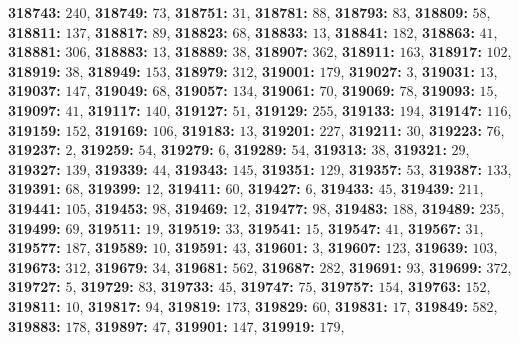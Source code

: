 \textsf{\bfseries 318743:} $240$, \textsf{\bfseries 318749:} $73$, \textsf{\bfseries 318751:} $31$, \textsf{\bfseries 318781:} $88$, \textsf{\bfseries 318793:} $83$, \textsf{\bfseries 318809:} $58$, \textsf{\bfseries 318811:} $137$, \textsf{\bfseries 318817:} $89$, \textsf{\bfseries 318823:} $68$, \textsf{\bfseries 318833:} $13$, \textsf{\bfseries 318841:} $182$, \textsf{\bfseries 318863:} $41$, \textsf{\bfseries 318881:} $306$, \textsf{\bfseries 318883:} $13$, \textsf{\bfseries 318889:} $38$, \textsf{\bfseries 318907:} $362$, \textsf{\bfseries 318911:} $163$, \textsf{\bfseries 318917:} $102$, \textsf{\bfseries 318919:} $38$, \textsf{\bfseries 318949:} $153$, \textsf{\bfseries 318979:} $312$, \textsf{\bfseries 319001:} $179$, \textsf{\bfseries 319027:} $3$, \textsf{\bfseries 319031:} $13$, \textsf{\bfseries 319037:} $147$, \textsf{\bfseries 319049:} $68$, \textsf{\bfseries 319057:} $134$, \textsf{\bfseries 319061:} $70$, \textsf{\bfseries 319069:} $78$, \textsf{\bfseries 319093:} $15$, \textsf{\bfseries 319097:} $41$, \textsf{\bfseries 319117:} $140$, \textsf{\bfseries 319127:} $51$, \textsf{\bfseries 319129:} $255$, \textsf{\bfseries 319133:} $194$, \textsf{\bfseries 319147:} $116$, \textsf{\bfseries 319159:} $152$, \textsf{\bfseries 319169:} $106$, \textsf{\bfseries 319183:} $13$, \textsf{\bfseries 319201:} $227$, \textsf{\bfseries 319211:} $30$, \textsf{\bfseries 319223:} $76$, \textsf{\bfseries 319237:} $2$, \textsf{\bfseries 319259:} $54$, \textsf{\bfseries 319279:} $6$, \textsf{\bfseries 319289:} $54$, \textsf{\bfseries 319313:} $38$, \textsf{\bfseries 319321:} $29$, \textsf{\bfseries 319327:} $139$, \textsf{\bfseries 319339:} $44$, \textsf{\bfseries 319343:} $145$, \textsf{\bfseries 319351:} $129$, \textsf{\bfseries 319357:} $53$, \textsf{\bfseries 319387:} $133$, \textsf{\bfseries 319391:} $68$, \textsf{\bfseries 319399:} $12$, \textsf{\bfseries 319411:} $60$, \textsf{\bfseries 319427:} $6$, \textsf{\bfseries 319433:} $45$, \textsf{\bfseries 319439:} $211$, \textsf{\bfseries 319441:} $105$, \textsf{\bfseries 319453:} $98$, \textsf{\bfseries 319469:} $12$, \textsf{\bfseries 319477:} $98$, \textsf{\bfseries 319483:} $188$, \textsf{\bfseries 319489:} $235$, \textsf{\bfseries 319499:} $69$, \textsf{\bfseries 319511:} $19$, \textsf{\bfseries 319519:} $33$, \textsf{\bfseries 319541:} $15$, \textsf{\bfseries 319547:} $41$, \textsf{\bfseries 319567:} $31$, \textsf{\bfseries 319577:} $187$, \textsf{\bfseries 319589:} $10$, \textsf{\bfseries 319591:} $43$, \textsf{\bfseries 319601:} $3$, \textsf{\bfseries 319607:} $123$, \textsf{\bfseries 319639:} $103$, \textsf{\bfseries 319673:} $312$, \textsf{\bfseries 319679:} $34$, \textsf{\bfseries 319681:} $562$, \textsf{\bfseries 319687:} $282$, \textsf{\bfseries 319691:} $93$, \textsf{\bfseries 319699:} $372$, \textsf{\bfseries 319727:} $5$, \textsf{\bfseries 319729:} $83$, \textsf{\bfseries 319733:} $45$, \textsf{\bfseries 319747:} $75$, \textsf{\bfseries 319757:} $154$, \textsf{\bfseries 319763:} $152$, \textsf{\bfseries 319811:} $10$, \textsf{\bfseries 319817:} $94$, \textsf{\bfseries 319819:} $173$, \textsf{\bfseries 319829:} $60$, \textsf{\bfseries 319831:} $17$, \textsf{\bfseries 319849:} $582$, \textsf{\bfseries 319883:} $178$, \textsf{\bfseries 319897:} $47$, \textsf{\bfseries 319901:} $147$, \textsf{\bfseries 319919:} $179$, 
